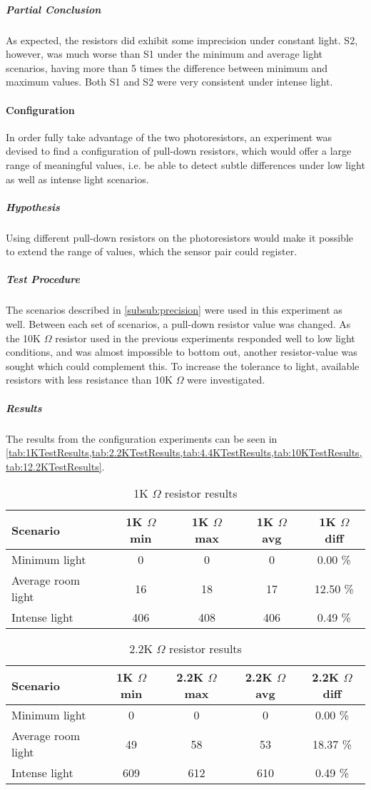\subparagraph{Partial Conclusion}
As expected, the resistors did exhibit some imprecision under constant light. S2, however, was much worse than S1 under the minimum and average light scenarios, having more than 5 times the difference between minimum and maximum values. Both S1 and S2 were very consistent under intense light.

\paragraph{Configuration}
In order fully take advantage of the two photoresistors, an experiment was devised to find a configuration of pull-down resistors, which would offer a large range of meaningful values, i.e. be able to detect subtle differences under low light as well as intense light scenarios.
\subparagraph{Hypothesis}
Using different pull-down resistors on the photoresistors would make it possible to extend the range of values, which the sensor pair could register.
\subparagraph{Test Procedure}
The scenarios described in \cref{subsub:precision} were used in this experiment as well. Between each set of scenarios, a pull-down resistor value was changed. As the 10K $\Omega$ resistor used in the previous experiments responded well to low light conditions, and was almost impossible to bottom out, another resistor-value was sought which could complement this. To increase the tolerance to light, available resistors with less resistance than 10K $\Omega$ were investigated.
\subparagraph{Results}
The results from the configuration experiments can be seen in \cref{tab:1KTestResults,tab:2.2KTestResults,tab:4.4KTestResults,tab:10KTestResults,tab:12.2KTestResults}.

\begin{table}[H]
  \centering
  \begin{tabular}{l c c c c}
    Scenario & 1K $\Omega$ min & 1K $\Omega$ max & 1K $\Omega$ avg & 1K $\Omega$ diff \\
    \hline
    Minimum light & 0 & 0 & 0 & 0.00 \% \\
    Average room light & 16 & 18 & 17 & 12.50 \% \\
    Intense light & 406 & 408 & 406 & 0.49 \% \\
  \end{tabular}
  \caption{1K $\Omega$ resistor results}\label{tab:1KTestResults}
\end{table}

\begin{table}[H]
  \centering
  \begin{tabular}{l c c c c}
    Scenario & 1K $\Omega$ min & 2.2K $\Omega$ max & 2.2K $\Omega$ avg & 2.2K $\Omega$ diff \\
    \hline
    Minimum light & 0 & 0 & 0 & 0.00 \% \\
    Average room light & 49 & 58 & 53 & 18.37 \% \\
    Intense light & 609 & 612 & 610 & 0.49 \% \\
  \end{tabular}
  \caption{2.2K $\Omega$ resistor results}\label{tab:2.2KTestResults}
\end{table}

